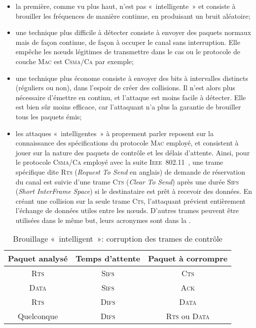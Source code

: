 \begin{itemize}
    \item la première, comme vu plus haut, n'est pas « intelligente » et consiste à brouiller les fréquences de manière continue, en produisant un bruit aléatoire;
    \item une technique plus difficile à détecter consiste à envoyer des paquets normaux mais de façon continue, de façon à occuper le canal sans interruption. Elle empêche les nœuds légitimes de transmettre dans le cas ou le protocole de couche \textsc{Mac} est \textsc{Csma/Ca} par exemple;
    \item une technique plus économe consiste à envoyer des bits à intervalles distincts (réguliers ou non), dans l'espoir de créer des collisions. Il n'est alors plus nécessaire d'émettre en continu, et l'attaque est moins facile à détecter. Elle est bien sûr moins efficace, car l'attaquant n'a plus la garantie de brouiller tous les paquets émis;
    \item les attaques « intelligentes » à proprement parler reposent sur la connaissance des spécifications du protocole \textsc{Mac} employé, et consistent à jouer sur la nature des paquets de contrôle et les délais d'attente. Ainsi, pour le protocole \textsc{Csma/Ca} employé avec la suite \textsc{Ieee~802.11}~\cite{ieee802.11}, une trame spécifique dite \textsc{Rts} (\textit{Request To Send} en anglais) de demande de réservation du canal est suivie d'une trame \textsc{Cts} (\textit{Clear To Send}) après une durée \textsc{Sifs} (\textit{Short InterFrame Space}) si le destinataire est prêt à recevoir des données. En créant une collision sur la seule trame \textsc{Cts}, l'attaquant prévient entièrement l'échange de données utiles entre les nœuds.
D'autres trames peuvent être utilisées dans le même but, leurs acronymes sont dans la .
\end{itemize}

\begin{table}[!ht]
    \caption{Brouillage « intelligent »: corruption des trames de contrôle}\label{ea:tab:smartjam}
    \centering
    \medskip
    \begin{tabular}{c c c}
        \toprule
        Paquet analysé & Temps d'attente & Paquet à corrompre\\
        \midrule
        \textsc{Rts} & \textsc{Sifs} & \textsc{Cts}\\
        \textsc{Data} & \textsc{Sifs} & \textsc{Ack}\\
        \textsc{Rts} & \textsc{Difs} & \textsc{Data}\\
        Quelconque & \textsc{Difs} & \textsc{Rts} ou \textsc{Data}\\
        \bottomrule
    \end{tabular}
\end{table}

